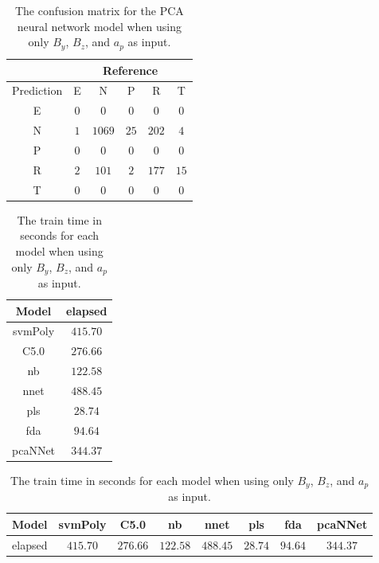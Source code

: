 \begin{table}[!ht]
	\centering
	\begin{tabular}{|c|c|c|c|c|c|}
		\hline
		 & \multicolumn{5}{|c|}{Reference} \\ \hline
		 Prediction & E & N & P & R & T \\ \hline
		 E & $0$ & $0$ & $0$ & $0$ & $0$ \\ \hline
		 N & $1$ & $1069$ & $25$ & $202$ & $4$ \\ \hline
		 P & $0$ & $0$ & $0$ & $0$ & $0$ \\ \hline
		 R & $2$ & $101$ & $2$ & $177$ & $15$ \\ \hline
		 T & $0$ & $0$ & $0$ & $0$ & $0$ \\ \hline
	\end{tabular}
	\caption{The confusion matrix for the PCA neural network model when using only $B_{y}$, $B_{z}$, and $a_{p}$ as input.}
	\label{tab:cm:yzap:pcaNNet}
\end{table}

\begin{table}[!ht]
	\centering
	\begin{tabular}{|c|c|}
		\hline
		Model & elapsed \\ \hline
		svmPoly & $415.70$ \\ \hline
		C5.0 & $276.66$ \\ \hline
		nb & $122.58$ \\ \hline
		nnet & $488.45$ \\ \hline
		pls & $28.74$ \\ \hline
		fda & $94.64$ \\ \hline
		pcaNNet & $344.37$ \\ \hline
	\end{tabular}
	\caption{The train time in seconds for each model when using only $B_{y}$, $B_{z}$, and $a_{p}$ as input.}
	\label{tab:time:yzap:train}
\end{table}

\begin{table}[!ht]
	\centering
	\begin{tabular}{|c|c|c|c|c|c|c|c|}
		\hline
		Model & svmPoly & C5.0 & nb & nnet & pls & fda & pcaNNet \\ \hline
		elapsed & $415.70$ & $276.66$ & $122.58$ & $488.45$ & $28.74$ & $94.64$ & $344.37$ \\ \hline
	\end{tabular}
	\caption{The train time in seconds for each model when using only $B_{y}$, $B_{z}$, and $a_{p}$ as input.}
	\label{tab:time:reverse:yzap:train}
\end{table}

